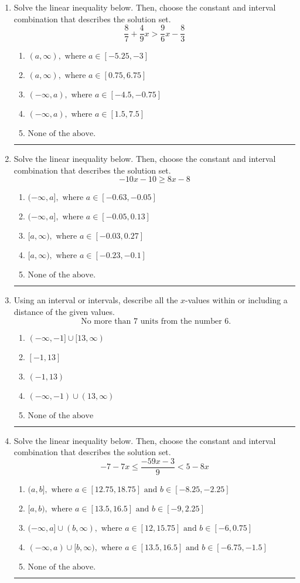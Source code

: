 \documentclass[14pt]{extbook}
\newcommand{\litem}[1]{\item#1\hspace*{-1cm}\rule{\textwidth}{0.4pt}}
\begin{document}
\begin{enumerate}
\litem{
Solve the linear inequality below. Then, choose the constant and interval combination that describes the solution set.\[ \frac{8}{7} + \frac{4}{9} x > \frac{9}{6} x - \frac{8}{3} \]\begin{enumerate}[label=\Alph*.]
\item \( (a, \infty), \text{ where } a \in [-5.25, -3] \)
\item \( (a, \infty), \text{ where } a \in [0.75, 6.75] \)
\item \( (-\infty, a), \text{ where } a \in [-4.5, -0.75] \)
\item \( (-\infty, a), \text{ where } a \in [1.5, 7.5] \)
\item \( \text{None of the above}. \)

\end{enumerate} }
\litem{
Solve the linear inequality below. Then, choose the constant and interval combination that describes the solution set.\[ -10x -10 \geq 8x -8 \]\begin{enumerate}[label=\Alph*.]
\item \( (-\infty, a], \text{ where } a \in [-0.63, -0.05] \)
\item \( (-\infty, a], \text{ where } a \in [-0.05, 0.13] \)
\item \( [a, \infty), \text{ where } a \in [-0.03, 0.27] \)
\item \( [a, \infty), \text{ where } a \in [-0.23, -0.1] \)
\item \( \text{None of the above}. \)

\end{enumerate} }
\litem{
Using an interval or intervals, describe all the $x$-values within or including a distance of the given values.\[ \text{ No more than } 7 \text{ units from the number } 6. \]\begin{enumerate}[label=\Alph*.]
\item \( (-\infty, -1] \cup [13, \infty) \)
\item \( [-1, 13] \)
\item \( (-1, 13) \)
\item \( (-\infty, -1) \cup (13, \infty) \)
\item \( \text{None of the above} \)

\end{enumerate} }
\litem{
Solve the linear inequality below. Then, choose the constant and interval combination that describes the solution set.\[ -7 - 7 x \leq \frac{-59 x - 3}{9} < 5 - 8 x \]\begin{enumerate}[label=\Alph*.]
\item \( (a, b], \text{ where } a \in [12.75, 18.75] \text{ and } b \in [-8.25, -2.25] \)
\item \( [a, b), \text{ where } a \in [13.5, 16.5] \text{ and } b \in [-9, 2.25] \)
\item \( (-\infty, a] \cup (b, \infty), \text{ where } a \in [12, 15.75] \text{ and } b \in [-6, 0.75] \)
\item \( (-\infty, a) \cup [b, \infty), \text{ where } a \in [13.5, 16.5] \text{ and } b \in [-6.75, -1.5] \)
\item \( \text{None of the above.} \)


\end{enumerate}}
\end{enumerate}
\end{document}
